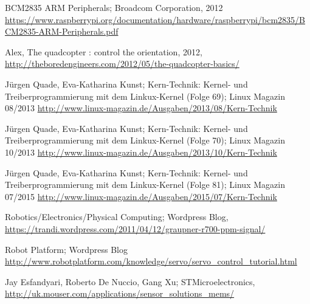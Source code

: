 \begin{thebibliography}{XXXX}
 BCM2835 ARM Peripherals; Broadcom Corporation, 2012 \url{https://www.raspberrypi.org/documentation/hardware/raspberrypi/bcm2835/BCM2835-ARM-Peripherals.pdf}

 Alex, The quadcopter : control the orientation, 2012, \url{http://theboredengineers.com/2012/05/the-quadcopter-basics/}

 J\"urgen Quade, Eva-Katharina Kunst; Kern-Technik: Kernel- und Treiberprogrammierung mit dem Linkux-Kernel (Folge 69); Linux Magazin 08/2013 \url{http://www.linux-magazin.de/Ausgaben/2013/08/Kern-Technik}

 J\"urgen Quade, Eva-Katharina Kunst; Kern-Technik: Kernel- und Treiberprogrammierung mit dem Linkux-Kernel (Folge 70); Linux Magazin 10/2013 \url{http://www.linux-magazin.de/Ausgaben/2013/10/Kern-Technik}

 J\"urgen Quade, Eva-Katharina Kunst; Kern-Technik: Kernel- und Treiberprogrammierung mit dem Linkux-Kernel (Folge 81); Linux Magazin 07/2015 \url{http://www.linux-magazin.de/Ausgaben/2015/07/Kern-Technik}

 Robotics/Electronics/Physical Computing; Wordpress Blog, \url{https://trandi.wordpress.com/2011/04/12/graupner-r700-ppm-signal/}

 Robot Platform; Wordpress Blog \url{http://www.robotplatform.com/knowledge/servo/servo_control_tutorial.html}

 Jay Esfandyari, Roberto De Nuccio, Gang Xu; STMicroelectronics, \url{http://uk.mouser.com/applications/sensor_solutions_mems/}

\end{thebibliography}